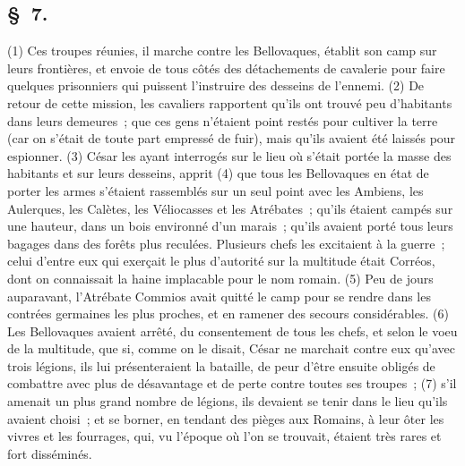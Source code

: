 \documentclass[french,twoside]{book} %
\begin{document}
\subsection[{§ 7.}]{ \textsc{§ 7.} }
\noindent (1) Ces troupes réunies, il marche contre les Bellovaques, établit son camp sur leurs frontières, et envoie de tous côtés des détachements de cavalerie pour faire quelques prisonniers qui puissent l’instruire des desseins de l’ennemi. (2) De retour de cette mission, les cavaliers rapportent qu’ils ont trouvé peu d’habitants dans leurs demeures ; que ces gens n’étaient point restés pour cultiver la terre (car on s’était de toute part empressé de fuir), mais qu’ils avaient été laissés pour espionner. (3) César les ayant interrogés sur le lieu où s’était portée la masse des habitants et sur leurs desseins, apprit (4) que tous les Bellovaques en état de porter les armes s’étaient rassemblés sur un seul point avec les Ambiens, les Aulerques, les Calètes, les Véliocasses et les Atrébates ; qu’ils étaient campés sur une hauteur, dans un bois environné d’un marais ; qu’ils avaient porté tous leurs bagages dans des forêts plus reculées. Plusieurs chefs les excitaient à la guerre ; celui d’entre eux qui exerçait le plus d’autorité sur la multitude était Corréos, dont on connaissait la haine implacable pour le nom romain. (5) Peu de jours auparavant, l’Atrébate Commios avait quitté le camp pour se rendre dans les contrées germaines les plus proches, et en ramener des secours considérables. (6) Les Bellovaques avaient arrêté, du consentement de tous les chefs, et selon le voeu de la multitude, que si, comme on le disait, César ne marchait contre eux qu’avec trois légions, ils lui présenteraient la bataille, de peur d’être ensuite obligés de combattre avec plus de désavantage et de perte contre toutes ses troupes ; (7) s’il amenait un plus grand nombre de légions, ils devaient se tenir dans le lieu qu’ils avaient choisi ; et se borner, en tendant des pièges aux Romains, à leur ôter les vivres et les fourrages, qui, vu l’époque où l’on se trouvait, étaient très rares et fort disséminés.
\end{document}
